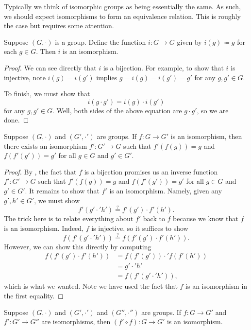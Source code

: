 \documentclass[../main.tex]{subfiles}
\begin{document}
Typically we think of isomorphic groups as being essentially the same. As such, we should expect isomorphisms to form an equivalence relation. This is roughly the case but requires some attention.
\begin{lemma} \label{lem:id-is-iso}
    Suppose $(G,\cdot)$ is a group. Define the function $i\colon G\to G$ given by $i(g)\coloneqq g$ for each $g\in G$. Then $i$ is an isomorphism.
\end{lemma}
\begin{proof}
    We can see directly that $i$ is a bijection. For example, to show that $i$ is injective, note $i(g)=i(g')$ implies $g=i(g)=i(g')=g'$ for any $g,g'\in G$.
    
    To finish, we must show that
    \[i(g\cdot g')=i(g)\cdot i(g')\]
    for any $g,g'\in G$. Well, both sides of the above equation are $g\cdot g'$, so we are done.
\end{proof}
\begin{lemma} \label{lem:inv-iso}
    Suppose $(G,\cdot)$ and $(G',\cdot')$ are groups. If $f\colon G\to G'$ is an isomorphism, then there exists an isomorphism $f'\colon G'\to G$ such that $f'(f(g))=g$ and $f(f'(g'))=g'$ for all $g\in G$ and $g'\in G'$.
\end{lemma}
\begin{proof}
    By , the fact that $f$ is a bijection promises us an inverse function $f'\colon G'\to G$ such that $f'(f(g))=g$ and $f(f'(g'))=g'$ for all $g\in G$ and $g'\in G'$. It remains to show that $f'$ is an isomorphism. Namely, given any $g',h'\in G'$, we must show
    \[f'(g'\cdot'h')\stackrel?=f'(g')\cdot f'(h').\]
    The trick here is to relate everything about $f'$ back to $f$ because we know that $f$ is an isomorphism. Indeed, $f$ is injective, so it suffices to show
    \[f(f'(g'\cdot'h'))\stackrel?=f(f'(g')\cdot f'(h')).\]
    However, we can show this directly by computing
    \begin{align*}
        f(f'(g')\cdot f'(h')) &= f(f'(g'))\cdot'f(f'(h')) \\
        &= g'\cdot'h' \\
        &= f(f'(g'\cdot'h')),
    \end{align*}
    which is what we wanted. Note we have used the fact that $f$ is an isomorphism in the first equality.
\end{proof}
\begin{lemma} \label{lem:comp-iso}
    Suppose $(G,\cdot)$ and $(G',\cdot')$ and $(G'',\cdot'')$ are groups. If $f\colon G\to G'$ and $f'\colon G'\to G''$ are isomorphisms, then $(f'\circ f)\colon G\to G'$ is an isomorphism.
\end{lemma}
\end{document}
